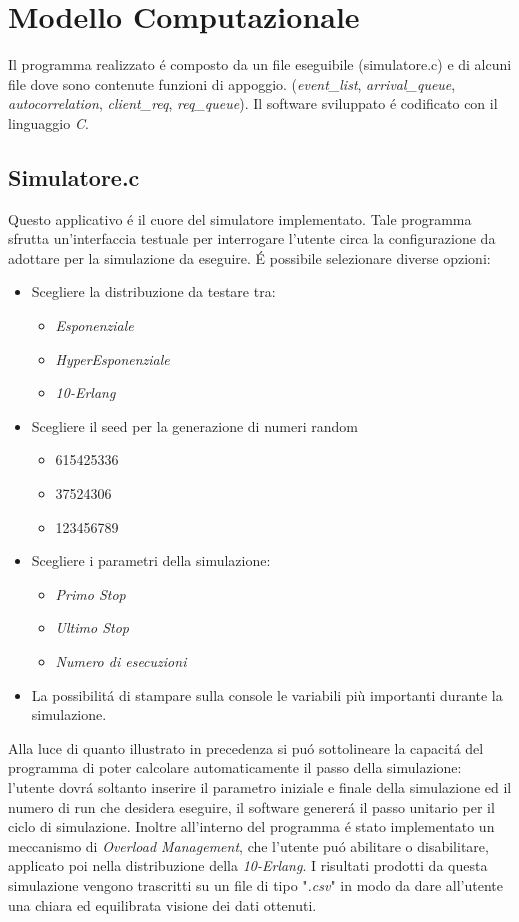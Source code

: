 \chapter{Modello Computazionale}
Il programma realizzato \'e composto da un file eseguibile (simulatore.c) e di alcuni file dove sono contenute funzioni di appoggio. (\textit{event\_list}, \textit{arrival\_queue}, \textit{autocorrelation}, \textit{client\_req}, \textit{req\_queue}).
Il software sviluppato \'e codificato con il linguaggio \textit{C}.

\section{Simulatore.c}

Questo applicativo \'e il cuore del simulatore implementato. Tale programma sfrutta un'interfaccia testuale per interrogare l'utente circa la configurazione da adottare per la simulazione da eseguire. 
\'E possibile selezionare diverse opzioni:
\begin{itemize}
\item Scegliere la distribuzione da testare tra:
\begin{itemize}
\item \textit{Esponenziale}
\item \textit{HyperEsponenziale}
\item \textit{10-Erlang}
\end{itemize}
\item Scegliere il seed per la generazione di numeri random
\begin{itemize}
\item 615425336
\item 37524306
\item 123456789
\end{itemize}
\item Scegliere i parametri della simulazione:
\begin{itemize}
\item \textit{Primo Stop}
\item \textit{Ultimo Stop}
\item \textit{Numero di esecuzioni}
\end{itemize}
\item La possibilit\'a di stampare sulla console le variabili più importanti durante la simulazione.
\end{itemize}

Alla luce di quanto illustrato in precedenza si pu\'o sottolineare la capacit\'a del programma di poter calcolare automaticamente il passo della simulazione: l'utente dovr\'a soltanto inserire il parametro iniziale e finale della simulazione ed il numero di run che desidera eseguire, il software generer\'a il passo unitario per il ciclo di simulazione.
Inoltre all'interno del programma \'e stato implementato un meccanismo di \textit{Overload Management}, che l'utente pu\'o abilitare o disabilitare, applicato poi nella distribuzione della \textit{10-Erlang}.
I risultati prodotti da questa simulazione vengono trascritti su un file di tipo "\textit{.csv}"  in modo da dare all'utente una chiara ed equilibrata visione dei dati ottenuti.

